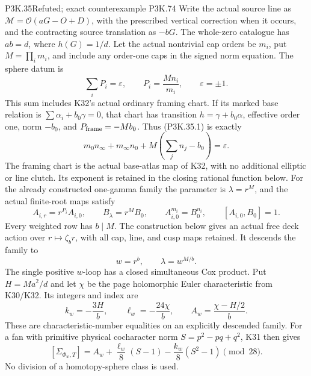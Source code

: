 \begin{statement}{P3K.35}{Refuted; exact counterexample P3K.74}
Write the actual source line as
\(\mathcal M=\mathcal O(aG-O+D)\), with the prescribed vertical
correction when it occurs, and the contracting source translation as
\(-bG\). The whole-zero catalogue has \(ab=d\), where \(h(G)=1/d\).
Let the actual nontrivial cap orders be \(m_i\), put
\(M=\prod_i m_i\), and include any order-one caps in the signed
norm equation. The sphere datum is
\[
           \sum_i P_i=\varepsilon,\qquad
           P_i=\frac{M n_i}{m_i},\qquad \varepsilon=\pm1.
                                                               \tag{P3K.35.1}
\]
This sum includes K32's actual ordinary framing chart. If its marked
base relation is \(\sum\alpha_i+b_0\gamma=0\), that chart has
transition \(h=\gamma+b_0\alpha\), effective order one, norm
\(-b_0\), and \(P_{\rm frame}=-Mb_0\). Thus (P3K.35.1) is exactly
\[
 m_0n_\infty+m_\infty n_0
                +M\left(\sum_jn_j-b_0\right)=\varepsilon.
\]
The framing chart is the actual base-atlas map of K32, with no
additional elliptic or line clutch. Its exponent is retained in
the closing rational function below.
For the already constructed one-gamma family the parameter is
\(\lambda=r^M\), and the actual finite-root maps satisfy
\[
 A_{i,r}=r^{P_i}A_{i,0},\qquad B_\lambda=r^M B_0,
 \qquad A_{i,0}^{m_i}=B_0^{n_i},\qquad[A_{i,0},B_0]=1.
                                                               \tag{P3K.35.2}
\]
Every weighted row has \(b\mid M\). The construction below gives
an actual free deck action over \(r\mapsto\zeta_b r\), with all
cap, line, and cusp maps retained. It descends the family to
\[
                     w=r^b,\qquad \lambda=w^{M/b}.       \tag{P3K.35.3}
\]
The single positive \(w\)-loop has a closed simultaneous Cox product.
Put \(H=Ma^2/d\) and let \(\chi\) be the page holomorphic Euler
characteristic from K30/K32. Its integers and index are
\[
 k_w=-\frac{3H}{b},\qquad
 \ell_w=-\frac{24\chi}{b},\qquad
 A_w=\frac{\chi-H/2}{b}.                              \tag{P3K.35.4}
\]
These are characteristic-number equalities on an explicitly descended
family. For a fan with primitive physical cocharacter norm
\(S=p^2-pq+q^2\), K31 then gives
\[
 [\Sigma_{\Phi_w,T}]
      =A_w+\frac{\ell_w}{8}(S-1)
                   -\frac{k_w}{8}(S^2-1)\pmod {28}.     \tag{P3K.35.5}
\]
No division of a homotopy-sphere class is used.
\end{statement}
